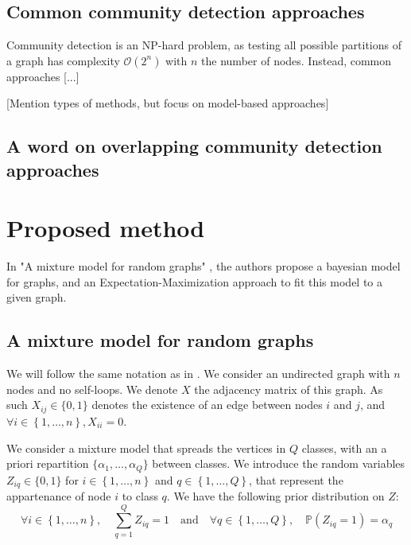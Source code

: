 \documentclass[11pt]{article}
\renewcommand{\O}{\mathcal{O}}
\begin{document}
\subsection{Common community detection approaches}

Community detection is an NP-hard problem, as testing all possible partitions of a graph has complexity $\O(2^n)$ with $n$ the number of nodes. Instead, common approaches [...]

    [Mention types of methods, but focus on model-based approaches]

\subsection{A word on overlapping community detection approaches}




\section{Proposed method}

In "A mixture model for random graphs" \cite{main_article}, the authors propose a bayesian model for graphs, and an Expectation-Maximization approach to fit this model to a given graph.

\subsection{A mixture model for random graphs}

We will follow the same notation as in \cite{main_article}. We consider an undirected graph with $n$ nodes and no self-loops. We denote $X$ the adjacency matrix of this graph. As such $X_{ij}\in \{0,1\}$ denotes the existence of an edge between nodes $i$ and $j$, and $\forall i\in \left\{1,\dots,n\right\}, X_{ii}=0$.

We consider a mixture model that spreads the vertices in $Q$ classes, with an a priori repartition $\{\alpha_1, \dots, \alpha_Q\}$ between classes. We introduce the random variables $Z_{iq} \in \{0,1\}$ for $i\in \left\{1,\dots,n\right\}$ and $q\in \left\{1,\dots,Q\right\}$, that represent the appartenance of node $i$ to class $q$. We have the following prior distribution on $Z$:
\begin{equation}
    \forall i\in \left\{1,\dots,n\right\}, \quad \sum_{q=1}^Q Z_{iq} = 1 \quad \text{and} \quad \forall q\in \left\{1,\dots,Q\right\},\quad \mathbb{P}(Z_{iq}=1)=\alpha_q
\end{equation}
\end{document}
